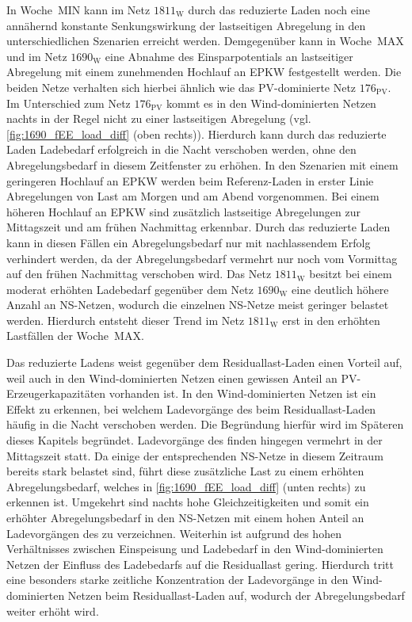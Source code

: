 In Woche~MIN kann im Netz \(1811_{\text{W}}\) durch das reduzierte Laden noch eine annähernd konstante Senkungswirkung der lastseitigen Abregelung in den unterschiedlichen Szenarien erreicht werden.
Demgegenüber kann in Woche~MAX und im Netz \(1690_{\text{W}}\) eine Abnahme des Einsparpotentials an lastseitiger Abregelung mit einem zunehmenden Hochlauf an \gls{EPKW} festgestellt werden.
Die beiden Netze verhalten sich hierbei ähnlich wie das \gls{PV}-dominierte Netz \(176_{\text{PV}}\).
Im Unterschied zum Netz \(176_{\text{PV}}\) kommt es in den Wind-dominierten Netzen nachts in der Regel nicht zu einer lastseitigen Abregelung (vgl. \autoref{fig:1690_fEE_load_diff} (oben rechts)).
Hierdurch kann durch das reduzierte Laden Ladebedarf erfolgreich in die Nacht verschoben werden, ohne den Abregelungsbedarf in diesem Zeitfenster zu erhöhen.
In den Szenarien mit einem geringeren Hochlauf an \gls{EPKW} werden beim Referenz-Laden in erster Linie Abregelungen von Last am Morgen und am Abend vorgenommen.
Bei einem höheren Hochlauf an \gls{EPKW} sind zusätzlich lastseitige Abregelungen zur Mittagszeit und am frühen Nachmittag erkennbar.
Durch das reduzierte Laden kann in diesen Fällen ein Abregelungsbedarf nur mit nachlassendem Erfolg verhindert werden, da der Abregelungsbedarf vermehrt nur noch vom Vormittag auf den frühen Nachmittag verschoben wird.
Das Netz \(1811_{\text{W}}\) besitzt bei einem moderat erhöhten Ladebedarf gegenüber dem Netz \(1690_{\text{W}}\) eine deutlich höhere Anzahl an \gls{NS}-Netzen, wodurch die einzelnen \gls{NS}-Netze meist geringer belastet werden.
Hierdurch entsteht dieser Trend im Netz \(1811_{\text{W}}\) erst in den erhöhten Lastfällen der Woche~MAX.



Das reduzierte Ladens weist gegenüber dem Residuallast-Laden einen Vorteil auf, weil auch in den Wind-dominierten Netzen einen gewissen Anteil an \gls{PV}-Erzeugerkapazitäten vorhanden ist.
In den Wind-dominierten Netzen ist ein Effekt zu erkennen, bei welchem Ladevorgänge des \UC \zH beim Residuallast-Laden häufig in die Nacht verschoben werden.
Die Begründung hierfür wird im Späteren dieses Kapitels begründet.
Ladevorgänge des \UC \Firmeparkplatz finden hingegen vermehrt in der Mittagszeit statt.
Da einige der entsprechenden \gls{NS}-Netze in diesem Zeitraum bereits stark belastet sind, führt diese zusätzliche Last zu einem erhöhten Abregelungsbedarf, welches in \autoref{fig:1690_fEE_load_diff} (unten rechts) zu erkennen ist.
Umgekehrt sind nachts hohe Gleichzeitigkeiten und somit ein erhöhter Abregelungsbedarf in den \gls{NS}-Netzen mit einem hohen Anteil an Ladevorgängen des \UC \zH zu verzeichnen.
Weiterhin ist aufgrund des hohen Verhältnisses zwischen Einspeisung und Ladebedarf in den Wind-dominierten Netzen der Einfluss des Ladebedarfs auf die Residuallast gering.
Hierdurch tritt eine besonders starke zeitliche Konzentration der Ladevorgänge in den Wind-dominierten Netzen beim Residuallast-Laden auf, wodurch der Abregelungsbedarf weiter erhöht wird.

